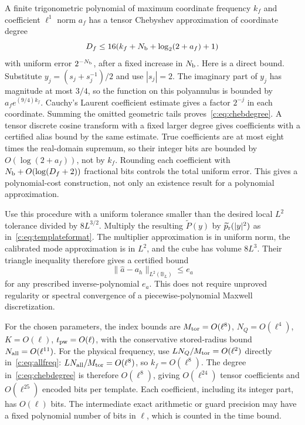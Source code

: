 A finite trigonometric polynomial of maximum coordinate frequency $k_f$
and coefficient $\ell^1$ norm $a_f$ has a tensor Chebyshev approximation
of coordinate degree
\begin{equation}
 D_f\le 16(k_f+N_{\rm b}+\log_2(2+a_f)+1)                  \label{c:eq:chebdegree}
\end{equation}
with uniform error $2^{-N_{\rm b}}$, after a fixed increase in $N_{\rm b}$.
Here is a direct bound. Substitute $y_j=(s_j+s_j^{-1})/2$ and use
$|s_j|=2$. The imaginary part of $y_j$ has magnitude at most $3/4$,
so the function on this polyannulus is bounded by
$a_f e^{(9/4)k_f}$. Cauchy's Laurent coefficient estimate gives a
factor $2^{-j}$ in each coordinate. Summing the omitted geometric
tails proves~\eqref{c:eq:chebdegree}. A tensor discrete cosine transform
with a fixed larger degree gives coefficients with a certified
alias bound by the same estimate. True coefficients are at most
eight times the real-domain supremum, so their integer bits are
bounded by $O(\log(2+a_f))$, not by $k_f$. Rounding each coefficient
with $N_{\rm b}+O(\log(D_f+2))$ fractional bits controls the total uniform
error. This gives a polynomial-cost construction, not only an
existence result for a polynomial approximation.

Use this procedure with a uniform tolerance smaller than the desired
local $L^2$ tolerance divided by $8L^{3/2}$. Multiply the resulting
$\widetilde P(y)$ by $\widetilde p_{\rm r}(|y|^2)$ as in~\eqref{c:eq:templateformat}.
The multiplier approximation is in uniform norm, the calibrated
mode approximation is in $L^2$, and the cube has volume $8L^3$.
Their triangle inequality therefore gives a certified bound
\begin{equation}
 \|\widehat a-a_h\|_{L^2(\mathbb B_L)}\le e_a          \label{c:eq:atesterror}
\end{equation}
for any prescribed inverse-polynomial $e_a$.
This does not require unproved regularity or spectral convergence
of a piecewise-polynomial Maxwell discretization.

For the chosen parameters, the index bounds are
$M_{\rm tor}=O(\ell^8)$, $N_Q=O(\ell^4)$, $K=O(\ell)$,
$t_{\rm pw}=O(\ell)$, with the conservative stored-radius bound
$N_{\rm all}=O(\ell^{11})$. For the physical frequency, use
$LN_Q/M_{\rm tor}=O(\ell^2)$ directly in~\eqref{c:eq:allfreq}:
$LN_{\rm all}/M_{\rm tor}=O(\ell^8)$, so $k_f=O(\ell^8)$.
The degree in~\eqref{c:eq:chebdegree} is therefore
$O(\ell^8)$, giving $O(\ell^{24})$ tensor coefficients and
$O(\ell^{25})$ encoded bits per template. Each coefficient, including
its integer part, has $O(\ell)$ bits. The intermediate
exact arithmetic or guard precision may have a fixed polynomial
number of bits in $\ell$, which is counted in the time bound.

